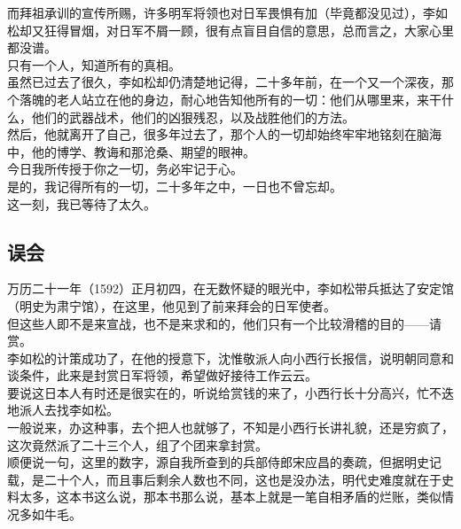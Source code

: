 \begin{multicols}{\theparacolNo}
而拜祖承训的宣传所赐，许多明军将领也对日军畏惧有加（毕竟都没见过），李如松却又狂得冒烟，对日军不屑一顾，很有点盲目自信的意思，总而言之，大家心里都没谱。\\

只有一个人，知道所有的真相。\\

虽然已过去了很久，李如松却仍清楚地记得，二十多年前，在一个又一个深夜，那个落魄的老人站立在他的身边，耐心地告知他所有的一切：他们从哪里来，来干什么，他们的武器战术，他们的凶狠残忍，以及战胜他们的方法。\\

然后，他就离开了自己，很多年过去了，那个人的一切却始终牢牢地铭刻在脑海中，他的博学、教诲和那沧桑、期望的眼神。\\

今日我所传授于你之一切，务必牢记于心。\\

是的，我记得所有的一切，二十多年之中，一日也不曾忘却。\\

这一刻，我已等待了太久。\\

\subsection{误会}
万历二十一年（1592）正月初四，在无数怀疑的眼光中，李如松带兵抵达了安定馆（明史为肃宁馆），在这里，他见到了前来拜会的日军使者。\\

但这些人即不是来宣战，也不是来求和的，他们只有一个比较滑稽的目的——请赏。\\

李如松的计策成功了，在他的授意下，沈惟敬派人向小西行长报信，说明朝同意和谈条件，此来是封赏日军将领，希望做好接待工作云云。\\

要说这日本人有时还是很实在的，听说给赏钱的来了，小西行长十分高兴，忙不迭地派人去找李如松。\\

一般说来，办这种事，去个把人也就够了，不知是小西行长讲礼貌，还是穷疯了，这次竟然派了二十三个人，组了个团来拿封赏。\\

顺便说一句，这里的数字，源自我所查到的兵部侍郎宋应昌的奏疏，但据明史记载，是二十个人，而且事后剩余人数也不同，这也是没办法，明代史难度就在于史料太多，这本书这么说，那本书那么说，基本上就是一笔自相矛盾的烂账，类似情况多如牛毛。\\


\end{multicols}
